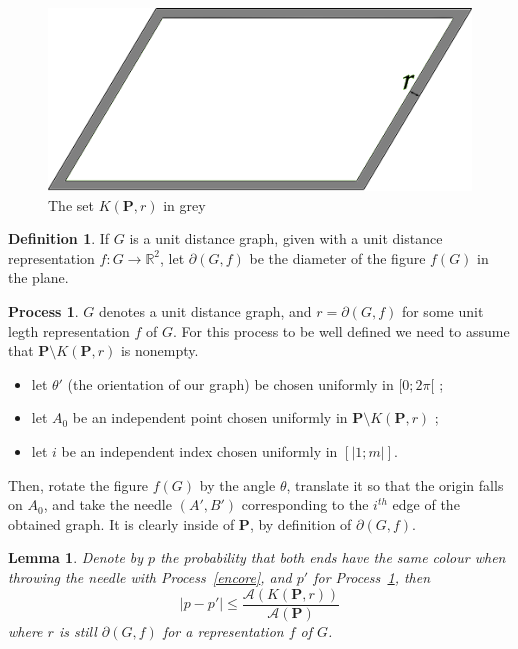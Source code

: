 \documentclass[a4paper,11pt]{article}
\newtheorem{lemma}{Lemma}
\theoremstyle{definition}
\newtheorem{definition}{Definition}
\newtheorem{process}{Process}
\theoremstyle{remark}
\begin{document}
\begin{figure}[h]
\center
\includegraphics[scale=0.5]{tablefinie.png}
\caption{\label{tablefinie} The set $K(\mathbf{P},r)$ in grey}
\end{figure}

\begin{definition}
If $G$ is a unit distance graph, given with a unit distance representation 
$f:G\rightarrow \mathbb{R}^2$, let $\partial (G,f)$ be the diameter of the 
figure $f(G)$ in the plane.
\end{definition}

\begin{process}\label{toujours}
$G$ denotes a unit distance graph, and $r=\partial (G,f)$ for some 
unit legth representation $f$ of $G$. For this process to be well defined we 
need to assume that $\mathbf{P} \setminus K(\mathbf{P},r)$ is nonempty.
\begin{itemize}
  \item let $\theta '$ (the orientation of our graph) be chosen uniformly 
  in $[0; 2 \pi[$ ;
  \item let $A_0$ be an independent point chosen uniformly in 
  $\mathbf{P} \setminus K(\mathbf{P},r)$ ;
  \item let $i$ be an independent index chosen uniformly in $[|1;m|]$.
\end{itemize}
Then, rotate the figure $f(G)$ by the angle $\theta$, translate it so that the origin 
falls on  $A_0$, and take the needle $(A',B')$ corresponding to the $i^{th}$ 
edge of the obtained graph. It is clearly inside of $\mathbf{P}$, by definition 
of $\partial(G,f)$.
\end{process}

\begin{lemma}
Denote by $p$ the probability that both ends have the same colour when throwing 
the needle with Process~\ref{encore}, and $p'$ for Process~\ref{toujours}, then 
$$ | p - p'| \leq \frac{\mathcal{A}(K(\mathbf{P},r))}{\mathcal{A}(\mathbf{P})} $$
where $r$ is still $\partial(G,f)$ for a representation $f$ of $G$.
\end{lemma}
\end{document}
